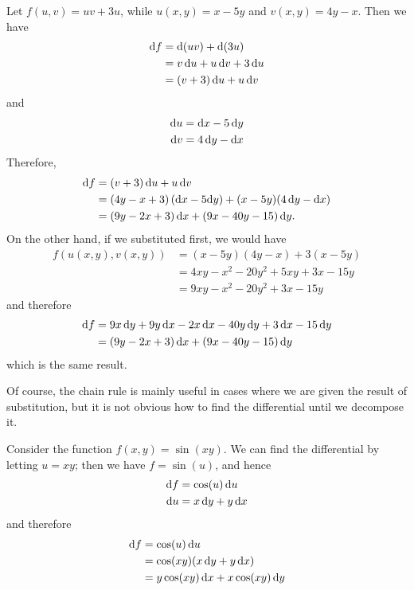 \documentclass[12pt]{amsart}
\begin{document}
\begin{eg}
  Let $f(u,v) = u v + 3u$, while $u(x,y) = x-5y$ and $v(x,y) = 4y-x$.
  Then we have
  \begin{align*}
    \mathrm{d} f &= \mathrm{d}(u v) + \mathrm{d}(3u)\\
    &= v \,\mathrm{d} u + u\,\mathrm{d} v + 3 \,\mathrm{d} u\\
    &= (v+3)\,\mathrm{d} u + u\,\mathrm{d} v
  \end{align*}
  and
  \begin{align*}
    \mathrm{d} u &= \mathrm{d} x - 5\, \mathrm{d} y\\
    \mathrm{d} v &= 4\,\mathrm{d} y - \mathrm{d} x
  \end{align*}
  Therefore,
  \begin{align*}
    \mathrm{d} f &= (v+3)\,\mathrm{d} u + u\,\mathrm{d} v\\
    &= (4y-x+3)\,(\mathrm{d} x - 5 \mathrm{d} y) + (x-5y) (4\,\mathrm{d} y - \mathrm{d} x) \\
    &= (9y-2x+3)\,\mathrm{d} x + (9x - 40y - 15)\,\mathrm{d} y.
  \end{align*}
  On the other hand, if we substituted first, we would have
  \begin{align*}
    f(u(x,y),v(x,y)) &= (x-5y)(4y-x) + 3(x-5y)\\
    &= 4xy - x^2 - 20y^2 + 5xy + 3x - 15 y\\
    &= 9xy - x^2 - 20y^2 + 3x - 15 y
  \end{align*}
  and therefore
  \begin{align*}
    \mathrm{d} f &= 9x\, \mathrm{d} y + 9y\, \mathrm{d} x - 2 x\,\mathrm{d} x - 40 y\,\mathrm{d} y + 3\,\mathrm{d} x - 15\,\mathrm{d} y\\
    &= (9y - 2x +3)\,\mathrm{d} x + (9x - 40y - 15)\,\mathrm{d} y
  \end{align*}
  which is the same result.
\end{eg}

Of course, the chain rule is mainly useful in cases where we are given the result of substitution, but it is not obvious how to find the differential until we decompose it.

\begin{eg}
  Consider the function $f(x,y) = \sin (xy)$.
  We can find the differential by letting $u=xy$; then we have $f = \sin(u)$, and hence
  \begin{align*}
    \mathrm{d} f &= \cos(u)\,\mathrm{d} u\\
    \mathrm{d} u &= x\,\mathrm{d} y + y\,\mathrm{d} x
  \end{align*}
  and therefore
  \begin{align*}
    \mathrm{d} f &= \cos(u)\,\mathrm{d} u \\
    &= \cos(xy) (x\,\mathrm{d} y + y\,\mathrm{d} x)\\
    &= y\cos(xy)\,\mathrm{d} x + x\cos(xy)\,\mathrm{d} y
  \end{align*}
\end{eg}
\end{document}
